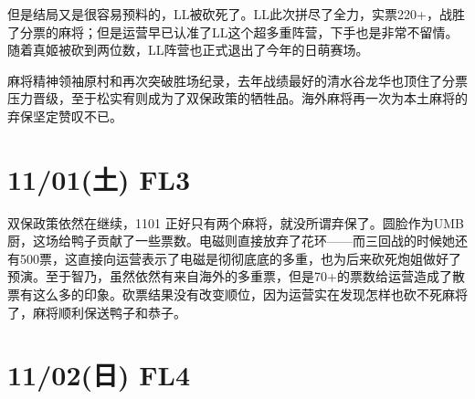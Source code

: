 但是结局又是很容易预料的，LL被砍死了。LL此次拼尽了全力，实票220+，战胜了分票的麻将；但是运营早已认准了LL这个超多重阵营，下手也是非常不留情。随着真姬被砍到两位数，LL阵营也正式退出了今年的日萌赛场。

麻将精神领袖原村和再次突破胜场纪录，去年战绩最好的清水谷龙华也顶住了分票压力晋级，至于松实宥则成为了双保政策的牺牲品。海外麻将再一次为本土麻将的弃保坚定赞叹不已。

\section{11/01(土) FL3}


双保政策依然在继续，1101 正好只有两个麻将，就没所谓弃保了。圆脸作为UMB厨，这场给鸭子贡献了一些票数。电磁则直接放弃了花环——而三回战的时候她还有500票，这直接向运营表示了电磁是彻彻底底的多重，也为后来砍死炮姐做好了预演。至于智乃，虽然依然有来自海外的多重票，但是70+的票数给运营造成了散票有这么多的印象。砍票结果没有改变顺位，因为运营实在发现怎样也砍不死麻将了，麻将顺利保送鸭子和恭子。

\section{11/02(日) FL4}


